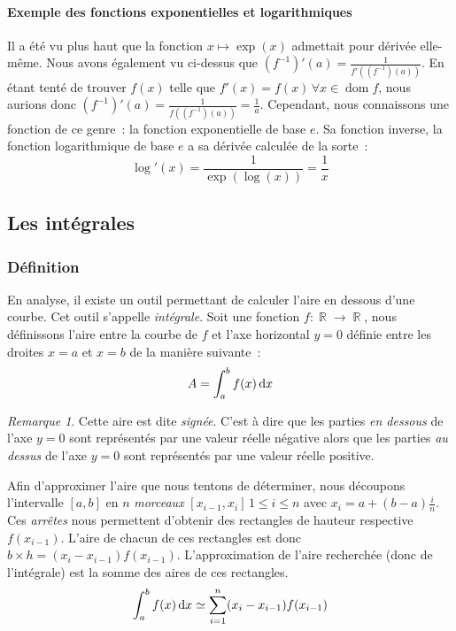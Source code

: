 \documentclass{article}
\DeclareMathOperator{\dom}{dom}
\DeclareMathOperator{\R}{\mathbb R}
\theoremstyle{definition}
\theoremstyle{remark}
\newtheorem*{rmq}{Remarque}
\begin{document}
		\paragraph{Exemple des fonctions exponentielles et logarithmiques} Il a été vu plus haut que la fonction $x \mapsto \exp(x)$
		admettait pour dérivée elle-même. Nous avons également vu ci-dessus que $(f^{-1})'(a) = \frac {1}{f'((f^{-1})(a))}$.
		En étant tenté de trouver $f(x)$ telle que $f'(x) = f(x) \, \forall x \in \dom f$, nous aurions donc $(f^{-1})'(a) = \frac {1}{f((f^{-1})(a))} = \frac 1a$.
		Cependant, nous connaissons une fonction de ce genre~: la fonction exponentielle de base $e$. Sa fonction inverse, la fonction
		logarithmique de base $e$ a sa dérivée calculée de la sorte~:
		\[\log'(x) = \frac {1}{\exp(\log(x))} = \frac 1x\]

	\subsection{Les intégrales}
		\subsubsection{Définition}
			En analyse, il existe un outil permettant de calculer l'aire en dessous d'une courbe. Cet outil s'appelle \textit{intégrale}.
			Soit une fonction $f : \R \to \R$, nous définissons l'aire entre la courbe de $f$ et l'axe horizontal $y = 0$
			définie entre les droites $x = a$ et $x = b$ de la manière suivante~:
			\[A = \int_a^bf(x)\dif x\]

			\begin{rmq} Cette aire est dite \textit{signée}. C'est à dire que les parties \textit{en dessous} de l'axe $y = 0$ sont représentés par une valeur
			réelle négative alors que les parties \textit{au dessus} de l'axe $y = 0$ sont représentés par une valeur réelle positive. \end{rmq}

			Afin d'approximer l'aire que nous tentons de déterminer, nous découpons l'intervalle $[a, b]$ en $n$ \textit{morceaux} $[x_{i-1}, x_i] \, 1 \leq i \leq n$
			avec $x_i = a + (b-a)\frac in$. Ces \textit{arrêtes} nous permettent d'obtenir des rectangles de hauteur respective $f(x_{i-1})$.
			L'aire de chacun de ces rectangles est donc $b \times h = (x_i - x_{i-1})f(x_{i-1})$. L'approximation de l'aire recherchée (donc de
			l'intégrale) est la somme des aires de ces rectangles.
			\[\int_a^bf(x) \dif x \simeq \sum_{i=1}^n(x_i - x_{i-1})f(x_{i-1})\]
\end{document}
